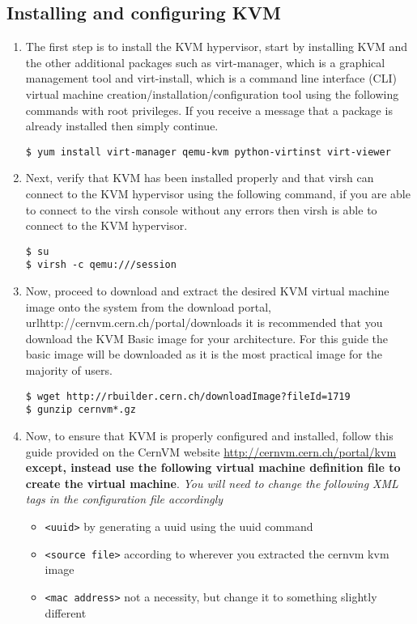 \subsection{Installing and configuring KVM}
\label{sec:rhkvm}
\begin{enumerate}
\item	The first step is to install the KVM hypervisor, start by installing KVM and the other additional packages such
		as virt-manager, which is a graphical management tool and virt-install, which is a command line interface (CLI)
		virtual machine creation/installation/configuration tool using the following commands with root privileges. If
		you receive a message that a package is already installed then simply continue.

\lstset{language=bash,caption=Installing KVM and Other Related Programs}
\begin{lstlisting}
$ yum install virt-manager qemu-kvm python-virtinst virt-viewer
\end{lstlisting}

\item	Next, verify that KVM has been installed properly and that virsh can connect to the KVM hypervisor using the
		following command, if you are able to connect to the virsh console without any errors then virsh is able
		to connect to the KVM hypervisor.

\lstset{language=bash,caption=Verify that virsh can Access KVM}
\begin{lstlisting}
$ su
$ virsh -c qemu:///session
\end{lstlisting}

\item	Now, proceed to download and extract the desired KVM virtual machine image onto the system from the \cernvm download 
		portal, url{http://cernvm.cern.ch/portal/downloads} it is recommended that you download the KVM Basic image for your 
		architecture. For this guide the basic image will be downloaded as it is the most practical image for the majority of 
		users.
		
\lstset{language=bash,caption=Download and Extract CernVM KVM Basic Image}
\begin{lstlisting}
$ wget http://rbuilder.cern.ch/downloadImage?fileId=1719
$ gunzip cernvm*.gz
\end{lstlisting}

\item 	Now, to ensure that KVM is properly configured and installed, follow this guide provided on the CernVM website
		\url{http://cernvm.cern.ch/portal/kvm} {\bf except, instead use the following virtual machine definition file to 
		create the virtual machine}. \emph{You will need to change the following XML tags in the configuration file accordingly}
\begin{itemize}
\item \verb|<uuid>| by generating a uuid using the uuid command
\item \verb|<source file>| according to wherever you extracted the cernvm kvm image
\item \verb|<mac address>| not a necessity, but change it to something slightly different
\end{itemize}


\end{enumerate}
